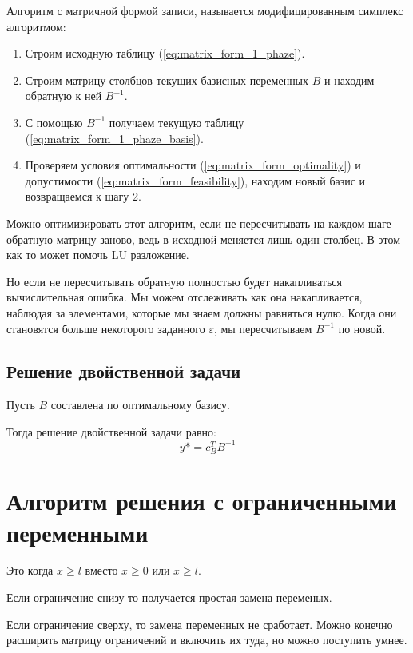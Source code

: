 \documentclass[a4paper,article,14pt]{extarticle}
\let\epsilon = \varepsilon
\begin{document}
Алгоритм с матричной формой записи, называется модифицированным симплекс алгоритмом:

\begin{enumerate}
    \item Строим исходную таблицу (\ref{eq:matrix_form_1_phaze}).
    \item Строим матрицу столбцов текущих базисных переменных \(B\) и находим обратную к ней \(B^{-1}\).
    \item С помощью \(B^{-1}\) получаем текущую таблицу (\ref{eq:matrix_form_1_phaze_basis}).
    \item Проверяем условия оптимальности (\ref{eq:matrix_form_optimality}) и допустимости (\ref{eq:matrix_form_feasibility}), находим новый базис и возвращаемся к шагу 2.
\end{enumerate}

Можно оптимизировать этот алгоритм, если не пересчитывать на каждом шаге обратную матрицу заново, ведь в исходной меняется лишь один столбец. В этом как то может помочь LU разложение.

Но если не пересчитывать обратную полностью будет накапливаться вычислительная ошибка.
Мы можем отслеживать как она накапливается, наблюдая за элементами, которые мы знаем должны равняться нулю. Когда они становятся больше некоторого заданного \(\epsilon\), мы пересчитываем \(B^{-1}\) по новой.

\subsection{Решение двойственной задачи}

Пусть \(B\) составлена по оптимальному базису.

Тогда решение двойственной задачи равно:
\begin{equation}
    y* = c_B^TB^{-1}
\end{equation}

\section{Алгоритм решения с ограниченными переменными}

Это когда \(x \ge l\) вместо \(x \ge 0\) или \(x \ge l\).

Если ограничение снизу то получается простая замена переменых.

Если ограничение сверху, то замена переменных не сработает.
Можно конечно расширить матрицу ограничений и включить их туда, но можно поступить умнее.
\end{document}
